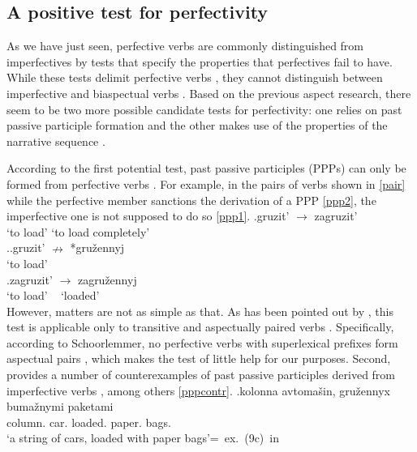 \subsection{A positive test for perfectivity }\label{sec:tests:new}
As we have just seen, perfective verbs  are commonly distinguished from imperfectives by tests that specify the properties that perfectives fail to have. While these tests delimit perfective verbs , they cannot distinguish between imperfective and biaspectual verbs . Based on the previous aspect research, there seem to be two more possible candidate tests for perfectivity: one relies on past  passive participle formation and the other makes use of the properties of the narrative sequence . %

According to the first potential test, past  passive participles (PPPs) can only be formed from perfective verbs . For example, in the pairs of verbs shown in \ref{pair} while the perfective member sanctions the derivation of a PPP \ref{ppp2}, the imperfective one is not supposed to do so \ref{ppp1}.
\exg.\label{pair}{gruzit'\textsuperscript{\IPF}} {$\rightarrow$} zagruzit'\textsuperscript{\PF}\\
{`to load'} {} {`to load completely'}\\

\ex.\ag.\label{ppp1}gruzit'\textsuperscript{\IPF} $\nrightarrow$ *gru\v{z}ennyj\\
{`to load'} {~} {~}\\
\bg.\label{ppp2}zagruzit'\textsuperscript{\PF} {$\rightarrow$} zagru\v{z}ennyj\\
{`to load'} {~} {`loaded'}\\

However, matters are not as simple as that. As has been pointed out by \citet{Schoorlemmer:95}, this test is applicable only to transitive and aspectually paired verbs . Specifically, according to Schoorlemmer, no perfective verbs  with superlexical prefixes  form aspectual pairs , which makes the test of little help for our purposes. Second, \citet{Romanova:06} provides a number of counterexamples of past  passive participles derived from imperfective verbs , among others \ref{pppcontr}.
\exg.\label{pppcontr}kolonna avtoma\v{s}in, gru\v{z}ennyx buma\v{z}nymi paketami \\
column. car. loaded. paper. bags.\\
\trans `a string of cars, loaded with paper bags'\hfill\hbox{= ex. (9c) in \citet[5]{Romanova:06}}

